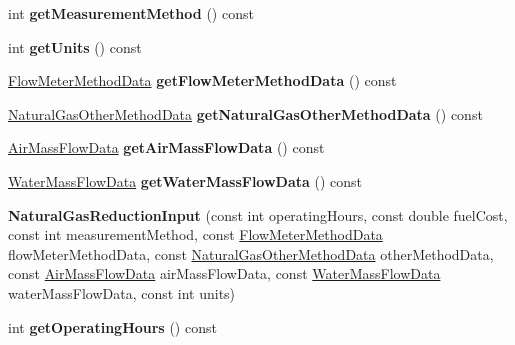 \begin{DoxyCompactItemize}
int {\bfseries get\+Measurement\+Method} () const
\item 
\mbox{\label{class_natural_gas_reduction_input_aca31b58c9d95adf451fcfeaadd72cd0f}} 
int {\bfseries get\+Units} () const
\item 
\mbox{\label{class_natural_gas_reduction_input_a9ef559f0c33b772fb0c83611fcd0aeab}} 
\hyperlink{class_flow_meter_method_data}{Flow\+Meter\+Method\+Data} {\bfseries get\+Flow\+Meter\+Method\+Data} () const
\item 
\mbox{\label{class_natural_gas_reduction_input_a09e0822339309acc767a1877f6bc9b74}} 
\hyperlink{class_natural_gas_other_method_data}{Natural\+Gas\+Other\+Method\+Data} {\bfseries get\+Natural\+Gas\+Other\+Method\+Data} () const
\item 
\mbox{\label{class_natural_gas_reduction_input_ab39430a5c9662d3f50c34ec58fdeab59}} 
\hyperlink{class_air_mass_flow_data}{Air\+Mass\+Flow\+Data} {\bfseries get\+Air\+Mass\+Flow\+Data} () const
\item 
\mbox{\label{class_natural_gas_reduction_input_aefc4121d546c3e26e702008868a2f4a3}} 
\hyperlink{class_water_mass_flow_data}{Water\+Mass\+Flow\+Data} {\bfseries get\+Water\+Mass\+Flow\+Data} () const
\item 
\mbox{\label{class_natural_gas_reduction_input_a7595cc335adbd9b2f4965df0bc487fb2}} 
{\bfseries Natural\+Gas\+Reduction\+Input} (const int operating\+Hours, const double fuel\+Cost, const int measurement\+Method, const \hyperlink{class_flow_meter_method_data}{Flow\+Meter\+Method\+Data} flow\+Meter\+Method\+Data, const \hyperlink{class_natural_gas_other_method_data}{Natural\+Gas\+Other\+Method\+Data} other\+Method\+Data, const \hyperlink{class_air_mass_flow_data}{Air\+Mass\+Flow\+Data} air\+Mass\+Flow\+Data, const \hyperlink{class_water_mass_flow_data}{Water\+Mass\+Flow\+Data} water\+Mass\+Flow\+Data, const int units)
\item 
\mbox{\label{class_natural_gas_reduction_input_a2c73074bd0a2d80c7006f2a3d48f0478}} 
int {\bfseries get\+Operating\+Hours} () const

\end{DoxyCompactItemize}
